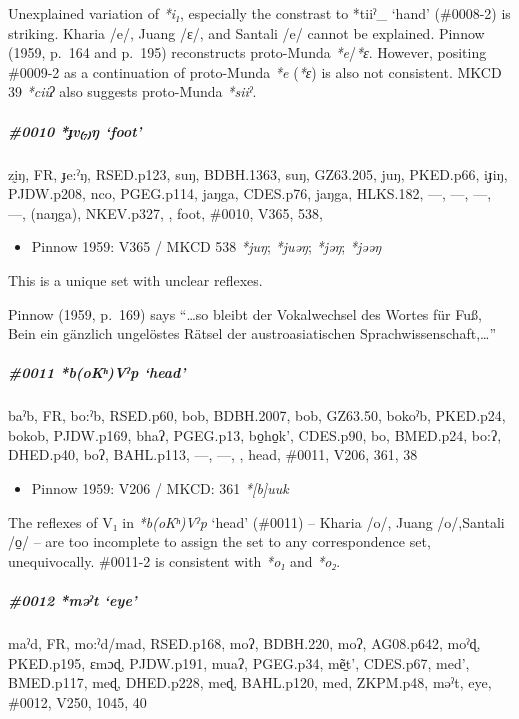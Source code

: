 \documentclass[a4paper,]{article}
\providecommand{\tightlist}{%
  \setlength{\itemsep}{0pt}\setlength{\parskip}{0pt}}
\let\oldsubparagraph\subparagraph
\renewcommand{\subparagraph}[1]{\oldsubparagraph{#1}\mbox{}}
\begin{document}
Unexplained variation of \emph{*i₁}, especially the constrast to *tiiˀ\_
`hand' (\#0008-2) is striking. Kharia /e/, Juang /ɛ/, and Santali /e/
cannot be explained. Pinnow (1959, p.~164 and p.~195) reconstructs
proto-Munda \emph{*e}/\emph{*ɛ}. However, positing \#0009-2 as a
continuation of proto-Munda \emph{*e} (\emph{*ɛ}) is also not
consistent. MKCD 39 \emph{*ciiʔ} also suggests proto-Munda \emph{*siiˀ}.

\subparagraph{\texorpdfstring{\#0010 \emph{*ɟv₍₇₎ŋ}
`foot'}{\#0010 *ɟv₍₇₎ŋ foot}}\label{ux25fvux14b-foot}

zḭŋ, FR, ɟe:ˀŋ, RSED.p123, suŋ, BDBH.1363, suŋ, GZ63.205, juŋ, PKED.p66,
iɟiŋ, PJDW.p208, nco, PGEG.p114, jaŋga, CDES.p76, jaŋga, HLKS.182, ---,
---, ---, ---, (naŋga), NKEV.p327, , foot, \#0010, V365, 538,

\begin{itemize}
\tightlist
\item
  Pinnow 1959: V365 / MKCD 538 \emph{*juŋ}; \emph{*juəŋ}; \emph{*jəŋ};
  \emph{*jəəŋ}
\end{itemize}

This is a unique set with unclear reflexes.

Pinnow (1959, p.~169) says ``\ldots{}so bleibt der Vokalwechsel des
Wortes für Fuß, Bein ein gänzlich ungelöstes Rätsel der
austroasiatischen Sprachwissenschaft,\ldots{}''

\subparagraph{\texorpdfstring{\#0011 \emph{*b(oKʰ)Vˀp}
`head'}{\#0011 *b(oKʰ)Vˀp head}}\label{bokux2b0vux2c0p-head}

baˀb, FR, bo:ˀb, RSED.p60, bob, BDBH.2007, bob, GZ63.50, bokoˀb,
PKED.p24, bokob, PJDW.p169, bhaʔ, PGEG.p13, bo̠ho̠k', CDES.p90, bo,
BMED.p24, bo:ʔ, DHED.p40, boʔ, BAHL.p113, ---, ---, , head, \#0011,
V206, 361, 38

\begin{itemize}
\tightlist
\item
  Pinnow 1959: V206 / MKCD: 361 \emph{*{[}b{]}uuk}
\end{itemize}

The reflexes of V₁ in \emph{*b(oKʰ)Vˀp} `head' (\#0011) -- Kharia /o/,
Juang /o/,Santali /o̠/ -- are too incomplete to assign the set to any
correspondence set, unequivocally. \#0011-2 is consistent with
\emph{*o₁} and \emph{*o₂}.

\subparagraph{\texorpdfstring{\#0012 \emph{*məˀt}
`eye'}{\#0012 *məˀt eye}}\label{mux259ux2c0t-eye}

maˀd, FR, mo:ˀd/mad, RSED.p168, moʔ, BDBH.220, moʔ, AG08.p642, moˀɖ,
PKED.p195, ɛmɔɖ, PJDW.p191, muaʔ, PGEG.p34, mẽ̠t', CDES.p67, med',
BMED.p117, meɖ, DHED.p228, meɖ, BAHL.p120, med, ZKPM.p48, məˀt, eye,
\#0012, V250, 1045, 40
\end{document}
